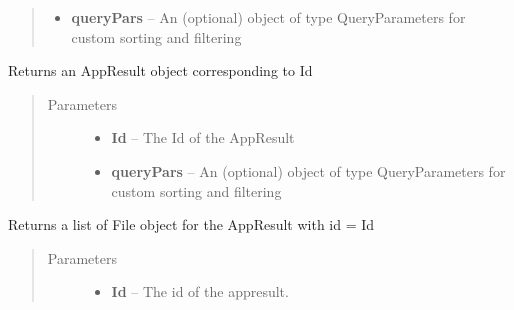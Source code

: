 \documentclass[letterpaper,10pt,english]{sphinxmanual}
\begin{document}
\begin{fulllineitems}
\begin{fulllineitems}
\begin{quote}
\begin{description}
\begin{itemize}
\item {} 
\textbf{queryPars} -- An (optional) object of type QueryParameters for custom sorting and filtering

\end{itemize}

\end{description}\end{quote}

\end{fulllineitems}


\begin{fulllineitems}
\label{Available modules:BaseSpacePy.api.BaseSpaceAPI.BaseSpaceAPI.getAppResultById}
Returns an AppResult object corresponding to Id
\begin{quote}\begin{description}
\item[{Parameters}] \leavevmode\begin{itemize}
\item {} 
\textbf{Id} -- The Id of the AppResult

\item {} 
\textbf{queryPars} -- An (optional) object of type QueryParameters for custom sorting and filtering

\end{itemize}

\end{description}\end{quote}

\end{fulllineitems}


\begin{fulllineitems}
\label{Available modules:BaseSpacePy.api.BaseSpaceAPI.BaseSpaceAPI.getAppResultFiles}
Returns a list of File object for the AppResult with id  = Id
\begin{quote}\begin{description}
\item[{Parameters}] \leavevmode\begin{itemize}
\item {} 
\textbf{Id} -- The id of the appresult.


\end{itemize}
\end{description}
\end{quote}
\end{fulllineitems}
\end{fulllineitems}
\end{document}
